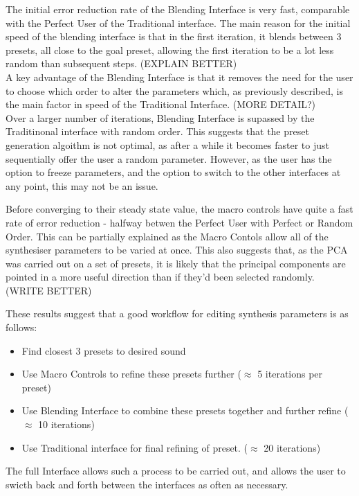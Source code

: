 \documentclass[11pt, oneside]{report}   	%
\begin{document}
The initial error reduction rate of the Blending Interface is very fast, comparable with the Perfect User of the Traditional interface. The main reason for the initial speed of the blending interface is that in the first iteration, it blends between 3 presets, all close to the goal preset, allowing the first iteration to be a lot less random than subsequent steps. (EXPLAIN BETTER)\\
A key advantage of the Blending Interface is that it removes the need for the user to choose which order to alter the parameters which, as previously described, is the main factor in speed of the Traditional Interface. (MORE DETAIL?)\\
 Over a larger number of iterations, Blending Interface is supassed by the Traditinonal interface with random order. This suggests that the preset generation algoithm is not optimal, as after a while it becomes faster to just sequentially offer the user a random parameter. However, as the user has the option to freeze parameters, and the option to switch to the other interfaces at any point, this may not be an issue. 
 

Before converging to their steady state value, the macro controls have quite a fast rate of error reduction - halfway betwen the Perfect User with Perfect or Random Order. This can be partially explained as the Macro Contols allow all of the synthesiser parameters to be varied at once. This also suggests that, as the PCA was carried out on a set of presets, it is likely that the principal components are pointed in a more useful direction than if they'd been selected randomly. (WRITE BETTER)

These results suggest that a good workflow for editing synthesis parameters is as follows:
\vspace{-3em}
\begin{itemize}
	\setlength\itemsep{-1.2em}
	\item Find closest 3 presets to desired sound
	\item Use Macro Controls to refine these presets further ($\approx$ 5 iterations per preset)
	\item Use Blending Interface to combine these presets together and further refine ($\approx$ 10 iterations)
	\item Use Traditional interface for final refining of preset. ($\approx$ 20 iterations)
\end{itemize}
\vspace{-0.5em}
The full Interface allows such a process to be carried out, and allows the user to swicth back and forth between the interfaces as often as necessary.
\end{document}
